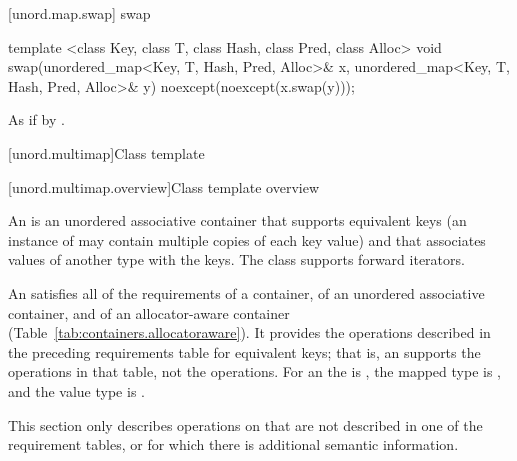 [unord.map.swap]{ swap}

%
%
\begin{itemdecl}
template <class Key, class T, class Hash, class Pred, class Alloc>
  void swap(unordered_map<Key, T, Hash, Pred, Alloc>& x,
            unordered_map<Key, T, Hash, Pred, Alloc>& y)
    noexcept(noexcept(x.swap(y)));
\end{itemdecl}

\begin{itemdescr}
\pnum\effects As if by .
\end{itemdescr}

[unord.multimap]{Class template }%

[unord.multimap.overview]{Class template  overview}

\pnum
{}%
%
An  is an unordered associative container
that supports equivalent keys (an instance of  may contain
multiple copies of each key value) and that associates values of
another type  with the keys.
The  class
supports forward iterators.

\pnum
An  satisfies all of the requirements of a container, of an
unordered associative container, and of an allocator-aware container
(Table~\ref{tab:containers.allocatoraware}). It provides the operations described in the
preceding requirements table for equivalent keys; that is, an 
supports the  operations in that table, not the  operations.
For an  the  is , the
mapped type is , and the value type is .

\pnum
This section only describes operations on 
that are not described in one of the requirement tables, or for which
there is additional semantic information.

